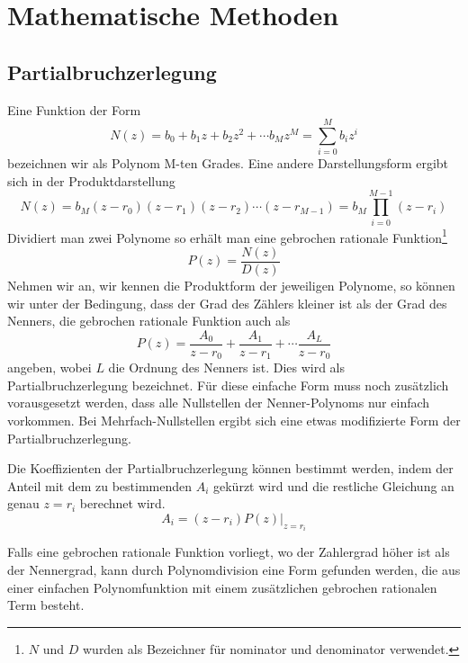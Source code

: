 ﻿\chapter{Mathematische Methoden}
\section{Partialbruchzerlegung\label{sec:An:Partialbruch}}
Eine Funktion der Form
\begin{equation}\label{eq:Anhang:DefPolynom}
    N(z) = b_0 + b_1z + b_2z^2+ \cdots b_M z^M = \sum_{i=0}^M b_i
    z^i
\end{equation}
bezeichnen wir als Polynom M-ten Grades. Eine andere
Darstellungsform ergibt sich in der Produktdarstellung
\begin{equation}\label{eq:AnhangDefPolynomProdukt}
    N(z) = b_M (z-r_0)(z-r_1)(z-r_2)\cdots(z-r_{M-1})=b_M
    \prod_{i=0}^{M-1}(z-r_i)
\end{equation}
Dividiert man zwei Polynome so erhält man eine gebrochen rationale
Funktion\footnote{$N$ und $D$ wurden als Bezeichner für nominator
und denominator verwendet.}
\begin{equation}\label{eq:Anhang:GebrochenRational}
    P(z) = \frac{N(z)}{D(z)}
\end{equation}
Nehmen wir an, wir kennen die Produktform der jeweiligen Polynome,
so können wir unter der Bedingung, dass der Grad des Zählers
kleiner ist als der Grad des Nenners, die gebrochen rationale
Funktion auch als
\begin{equation}\label{eq:Anhang:PartialZer}
    P(z) = \frac{A_0}{z-r_0} + \frac{A_1}{z-r_1}+ \cdots \frac{A_L}{z-r_0}
\end{equation}
angeben, wobei $L$ die Ordnung des Nenners ist. Dies wird als
Partialbruchzerlegung bezeichnet. Für diese einfache Form muss
noch zusätzlich vorausgesetzt werden, dass alle Nullstellen der
Nenner-Polynoms nur einfach vorkommen. Bei Mehrfach-Nullstellen
ergibt sich eine etwas modifizierte Form der
Partialbruchzerlegung.

Die Koeffizienten der Partialbruchzerlegung können bestimmt
werden, indem der Anteil mit dem zu bestimmenden $A_i$ gekürzt
wird und die restliche Gleichung an genau $z = r_i$ berechnet
wird.
\begin{equation}\label{eq:Anhang:KoeffsPartial}
    A_i = (z-r_i)P(z)\big|_{z=r_i}
\end{equation}

Falls eine gebrochen rationale Funktion vorliegt, wo der
Zahlergrad höher ist als der Nennergrad, kann durch
Polynomdivision eine Form gefunden werden, die aus einer einfachen
Polynomfunktion mit einem zusätzlichen gebrochen rationalen Term
besteht.


